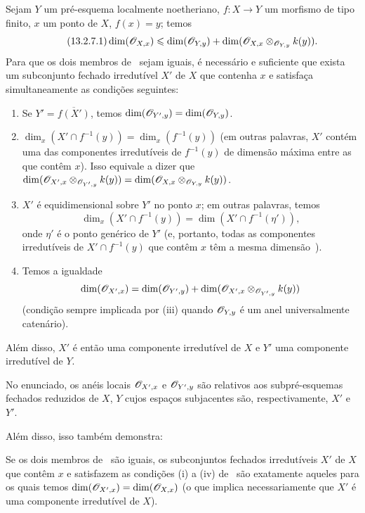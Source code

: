 \begin{proposition}[13.2.7]
\label{IV.13.2.7}
Sejam $Y$ um pré-esquema localmente noetheriano,
$f:X\to Y$ um morfismo de tipo finito, $x$ um ponto de $X$, $f(x)=y$; temos
\[
\tag{13.2.7.1}
\label{IV.13.2.7.1}
  \dim(\sh{O}_{X,x})\leq\dim(\sh{O}_{Y,y})+\dim(\sh{O}_{X,x}\otimes_{\sh{O}_{Y,y}}k(y)).
\]
Para que os dois membros de~ sejam iguais, é necessário e
suficiente que exista um subconjunto fechado irredutível $X'$ de $X$ que
contenha $x$ e satisfaça simultaneamente as condições seguintes:
\begin{enumerate}[label=(\roman*)]
  \item Se $Y'=\overline{f(X')}$, temos
  $\dim(\mathscr{O}_{Y',y})=\dim(\mathscr{O}_{Y,y})$.
  \item $\dim_x(X'\cap f^{-1}(y))=\dim_x(f^{-1}(y))$
  (em outras palavras, $X'$ contém uma das componentes irredutíveis de
  $f^{-1}(y)$ de dimensão máxima entre as que contêm $x$).
  Isso equivale a dizer que
  $\dim(\mathscr{O}_{X',x}\otimes_{\mathscr{O}_{Y',y}}k(y))=\dim(\mathscr{O}_{X,x}\otimes_{\mathscr{O}_{Y,y}}k(y))$.
  \item $X'$ é equidimensional sobre $Y'$ no ponto $x$; em outras palavras,
  temos
  \[
    \dim_x(X'\cap f^{-1}(y))=\dim(X'\cap f^{-1}(\eta')),
  \]
  onde $\eta'$ é o ponto genérico de $Y'$ (e, portanto, todas as componentes
  irredutíveis de $X'\cap f^{-1}(y)$ que contêm $x$ têm a mesma
  dimensão~).
  \item Temos a igualdade
  \[
    \dim(\mathscr{O}_{X',x})=\dim(\mathscr{O}_{Y',y})+\dim(\mathscr{O}_{X',x}\otimes_{\mathscr{O}_{Y',y}}k(y))
  \]
  (condição sempre implicada por (iii) quando $\mathscr{O}_{Y,y}$ é um anel
  universalmente catenário).
\end{enumerate}
Além disso, $X'$ é então uma componente irredutível de $X$ e $Y'$ uma
componente irredutível de $Y$.
\end{proposition}

No enunciado, os anéis locais $\mathscr{O}_{X',x}$ e $\mathscr{O}_{Y',y}$ são relativos
aos subpré-esquemas fechados reduzidos de $X$, $Y$ cujos espaços subjacentes
são, respectivamente, $X'$ e $Y'$.

Além disso, isso também demonstra:

\begin{corollary}[13.2.8]
\label{IV.13.2.8}
Se os dois membros de~ são iguais, os subconjuntos fechados
irredutíveis $X'$ de $X$ que contêm $x$ e satisfazem as condições (i) a (iv)
de~ são exatamente aqueles para os quais temos
$\dim(\mathscr{O}_{X',x})=\dim(\mathscr{O}_{X,x})$ (o que implica necessariamente que
$X'$ é uma componente irredutível de $X$).
\end{corollary}

